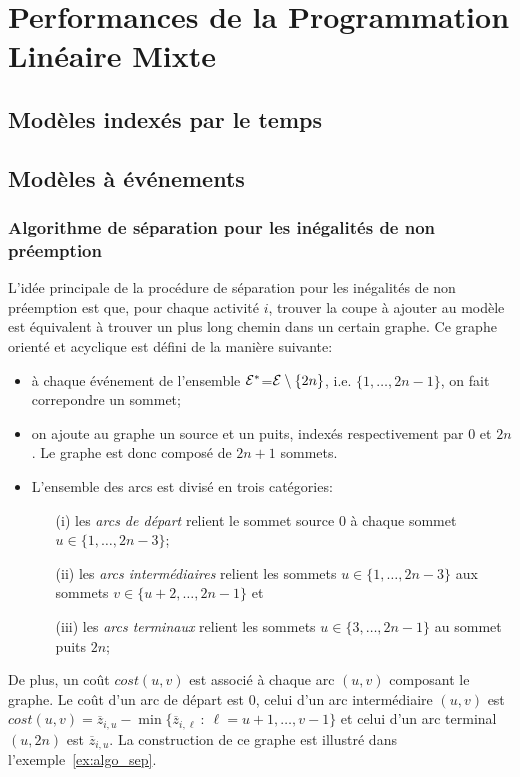 \section{Performances de la Programmation Linéaire Mixte}

\subsection{Modèles indexés par le temps}

\subsection{Modèles à événements}


\subsubsection{Algorithme de séparation pour les inégalités de non
  préemption} 

L'idée principale de la procédure de séparation pour les inégalités de
non préemption est que, pour chaque activité $i$, trouver la coupe à
ajouter au modèle est équivalent à trouver un plus long chemin dans un
certain graphe. Ce graphe orienté et acyclique est défini de la
manière suivante:
\begin{itemize}
\item à chaque événement de l'ensemble ${\cal E}^*$=${\cal E} \setminus\{2n\}$,
i.e. $\{1,\dots,2n-1\}$, on fait correpondre un sommet;
\item on ajoute au graphe un source et un puits, indexés
respectivement par $0$ et $2n$. Le graphe est donc composé de $2n+1$
sommets.
\item L'ensemble des arcs est divisé en trois catégories:
  \begin{itemize}
  \item[(i)] les {\it arcs de départ} relient le sommet source $0$ à
chaque sommet $u \in \{1,\dots,2n-3\}$;
  \item[(ii)] les {\it arcs intermédiaires} relient les sommets $u \in
\{1,\dots, 2n-3\}$ aux sommets $v \in \{u+2,\dots,2n-1\}$ et
  \item[(iii)] les {\it arcs terminaux} relient les sommets $u \in
\{3,\dots,2n-1\}$ au sommet puits $2n$;
  \end{itemize}
\end{itemize}

De plus, un coût $cost(u,v)$ est associé à chaque arc $(u,v)$
composant le graphe. Le coût d'un arc de départ est $0$, celui d'un
arc intermédiaire $(u,v)$ est $cost(u,v)= \overline{z}_{i,u} -
\min\{ \overline{z}_{i,\ell}\ :\ \ell= u+1,\dots, v-1\}$ et celui
d'un arc terminal $(u,2n)$ est $\overline{z}_{i,u}$. La construction
de ce graphe est illustré dans l'exemple~\ref{ex:algo_sep}.

